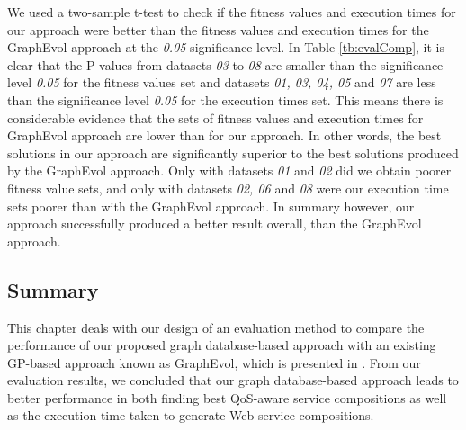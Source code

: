 We used a two-sample t-test to check if the fitness values and execution times for our approach were better than the fitness values and execution times for the GraphEvol approach at the \emph{0.05} significance level. In Table \ref{tb:evalComp}, it is clear that the P-values from datasets \emph{03} to \emph{08} are smaller than the significance level \emph{0.05} for the fitness values set and datasets \emph{01, 03, 04, 05} and \emph{07} are less than the significance level \emph{0.05} for the execution times set. This means there is considerable evidence that the sets of fitness values and execution times for GraphEvol approach are lower than for our approach. In other words, the best solutions in our approach are significantly superior to the best solutions produced by the GraphEvol approach. Only with datasets \emph{01} and \emph{02} did we obtain poorer fitness value sets, and only with datasets \emph{02, 06} and \emph{08} were our execution time sets poorer than with the GraphEvol approach. In summary however, our approach successfully produced a better result overall, than the GraphEvol approach.\par

\subsection{Summary}
This chapter deals with our design of an evaluation method to compare the performance of our proposed graph database-based approach with an existing GP-based approach known as GraphEvol, which is presented in \cite{2}. From our evaluation results, we concluded that our graph database-based approach leads to better performance in both finding best QoS-aware service compositions as well as the execution time taken to generate Web service compositions.\par

